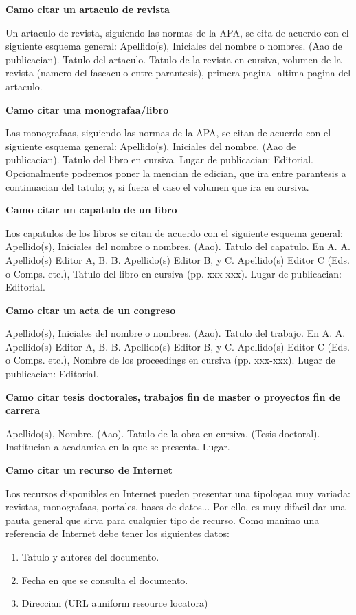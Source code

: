 \bigskip
{\bf Camo citar un artaculo de revista}

Un artaculo de revista, siguiendo las normas de la APA, se cita de acuerdo con el siguiente esquema general:
Apellido(s), Iniciales del nombre o nombres. (Aao de publicacian). Tatulo del artaculo. Tatulo de la revista en cursiva, volumen de la revista (namero del fascaculo entre parantesis), primera pagina- altima pagina del artaculo.

\bigskip
{\bf Camo citar una monografaa/libro}

Las monografaas, siguiendo las normas de la APA, se citan de acuerdo con el siguiente esquema general:
Apellido(s), Iniciales del nombre. (Aao de publicacian). Tatulo del libro en cursiva. Lugar de publicacian: Editorial.
Opcionalmente podremos poner la mencian de edician, que ira entre parantesis a continuacian del tatulo; y, si fuera el caso el volumen que ira en cursiva.

\bigskip
{\bf Camo citar un capatulo de un libro}

Los capatulos de los libros se citan de acuerdo con el siguiente esquema general:
Apellido(s), Iniciales del nombre o nombres. (Aao). Tatulo del capatulo. En A. A. Apellido(s) Editor A, B. B. Apellido(s) Editor B, y C. Apellido(s) Editor C (Eds. o Comps. etc.), Tatulo del libro en cursiva (pp. xxx-xxx). Lugar de publicacian: Editorial.

\bigskip
{\bf Camo citar un acta de un congreso}

Apellido(s), Iniciales del nombre o nombres. (Aao). Tatulo del trabajo. En A. A. Apellido(s) Editor A, B. B. Apellido(s) Editor B, y C. Apellido(s) Editor C (Eds. o Comps. etc.), Nombre de los proceedings en cursiva (pp. xxx-xxx). Lugar de publicacian: Editorial.

\bigskip
{\bf Camo citar tesis doctorales, trabajos fin de master o proyectos fin de carrera}

Apellido(s), Nombre. (Aao). Tatulo de la obra en cursiva. (Tesis doctoral). Institucian a acadamica en la que se presenta. Lugar.

\bigskip
{\bf Camo citar un recurso de Internet}

Los recursos disponibles en Internet pueden presentar una tipologaa muy variada: revistas, monografaas, portales, bases de datos... Por ello, es muy difacil dar una pauta general que sirva para cualquier tipo de recurso.
Como manimo una referencia de Internet debe tener los siguientes datos:
\begin{enumerate}
\item Tatulo y autores del documento.
\item Fecha en que se consulta el documento.
\item Direccian (URL auniform resource locatora)
\end{enumerate}

